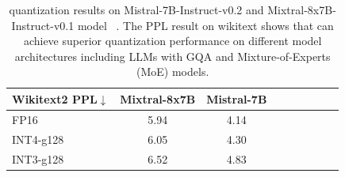 \begin{table}
    \setlength{\tabcolsep}{5pt}
    \small
    \centering
    \begin{tabular}{lcccccccc}
      \toprule
        \textbf{Wikitext2 PPL}$\downarrow$ & Mixtral-8x7B  & Mistral-7B \\  \midrule
      FP16 & 5.94 & 4.14 \\ \midrule
      INT4-g128 & 6.05 & 4.30	 \\
       INT3-g128 & 6.52 & 4.83  \\
      \bottomrule
    \end{tabular}
    \caption{\methodshort quantization results on Mistral-7B-Instruct-v0.2\cite{jiang2023mistral} and Mixtral-8x7B-Instruct-v0.1 model ~\cite{jiang2024mixtral}. The PPL result on wikitext shows that \methodshort can achieve superior quantization performance on different model architectures including LLMs with GQA and Mixture-of-Experts (MoE) models.}
    \label{tab:opt_ppl}
\end{table}
